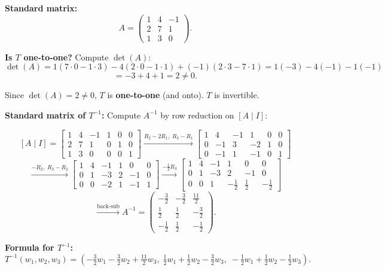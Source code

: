 \documentclass[12pt,a3paper]{article}
\begin{document}
\begin{tcolorbox}[enhanced,breakable,
  colback=cF!4,colframe=cF,boxrule=0.8pt,arc=5pt,
  title={\textbf{Answer --- $T:\mathbb{R}^3\to\mathbb{R}^3$ (given by $w_i$): One-to-One? Inverse?}},
  fonttitle=\bfseries\color{white},colbacktitle=cF]

\textbf{Standard matrix:}
\[
A=\begin{pmatrix}1&4&-1\\2&7&1\\1&3&0\end{pmatrix}.
\]

\textbf{Is $T$ one-to-one?} Compute $\det(A)$:
\[
\det(A)=1(7\cdot0-1\cdot3)-4(2\cdot0-1\cdot1)+(-1)(2\cdot3-7\cdot1)=1(-3)-4(-1)-1(-1)
\]
\[
=-3+4+1=2\neq0.
\]

Since $\det(A)=2\neq0$, $T$ is \textbf{one-to-one} (and onto). $T$ is invertible.

\medskip\textbf{Standard matrix of $T^{-1}$:} Compute $A^{-1}$ by row reduction on $[A\mid I]$:

\[
[A\mid I]=\left[\begin{array}{ccc|ccc}1&4&-1&1&0&0\\2&7&1&0&1&0\\1&3&0&0&0&1\end{array}\right]
\xrightarrow{R_2-2R_1,\;R_3-R_1}
\left[\begin{array}{ccc|ccc}1&4&-1&1&0&0\\0&-1&3&-2&1&0\\0&-1&1&-1&0&1\end{array}\right]
\]
\[
\xrightarrow{-R_2,\;R_3-R_2}
\left[\begin{array}{ccc|ccc}1&4&-1&1&0&0\\0&1&-3&2&-1&0\\0&0&-2&1&-1&1\end{array}\right]
\xrightarrow{-\frac{1}{2}R_3}
\left[\begin{array}{ccc|ccc}1&4&-1&1&0&0\\0&1&-3&2&-1&0\\0&0&1&-\frac{1}{2}&\frac{1}{2}&-\frac{1}{2}\end{array}\right]
\]
\[
\xrightarrow{\text{back-sub}}
A^{-1}=\begin{pmatrix}-\frac{3}{2}&-\frac{3}{2}&\frac{11}{2}\\[4pt]\frac{1}{2}&\frac{1}{2}&-\frac{3}{2}\\[4pt]-\frac{1}{2}&\frac{1}{2}&-\frac{1}{2}\end{pmatrix}.
\]

\textbf{Formula for $T^{-1}$:}
\[
T^{-1}(w_1,w_2,w_3)=\left(-\tfrac{3}{2}w_1-\tfrac{3}{2}w_2+\tfrac{11}{2}w_3,\;\tfrac{1}{2}w_1+\tfrac{1}{2}w_2-\tfrac{3}{2}w_3,\;-\tfrac{1}{2}w_1+\tfrac{1}{2}w_2-\tfrac{1}{2}w_3\right).
\]

\end{tcolorbox}
\end{document}
